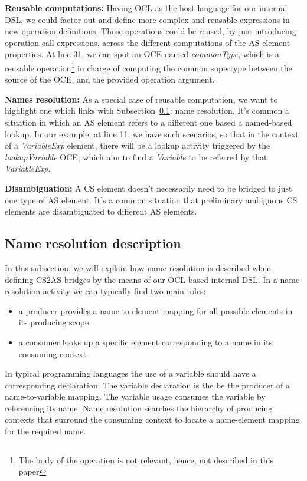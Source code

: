 \documentclass{llncs}
\begin{document}
\textbf{Reusable computations:} Having OCL as the  host language for our internal DSL, we could factor out and define more complex and reusable expressions in new operation definitions. Those operations could be reused, by just introducing operation call expressions, across the different computations of the AS element properties. At line 31, we can spot an OCE named \emph{commonType}, which is a reusable operation\footnote{The body of the operation is not relevant, hence, not described in this paper} in charge of computing the common supertype between the source of the OCE, and the provided operation argument.

\textbf{Names resolution:} As a special case of reusable computation, we want to highlight one which links with Subsection~\ref{subsec:nameReso}: name resolution. It's common a situation in which an AS element refers to a different one based a named-based lookup. In our example, at line 11, we have such scenarios, so that in the context of a \emph{VariableExp} element, there will be a lookup activity triggered by the \emph{lookupVariable} OCE, which aim to find a \emph{Variable} to be referred by that \emph{VariableExp}.

\textbf{Disambiguation:} A CS element doesn't necessarily need to be bridged to just one type of AS element. It's a common situation that preliminary ambiguous CS elements are disambiguated to different AS elements. %

\subsection{Name resolution description}
\label{subsec:nameReso}
In this subsection, we will explain how name resolution is described when defining CS2AS bridges by the means of our OCL-based internal DSL. In a name resolution activity we can typically find two main roles:
\begin{itemize}
\item a producer provides a name-to-element mapping for all possible elements in its producing scope. 
\item a consumer looks up a specific element corresponding to a name in its consuming context
\end{itemize}
In typical programming languages the use of a variable should have a corresponding declaration. The variable declaration is the be the producer of a name-to-variable mapping. The variable usage consumes the variable by referencing its name. Name resolution searches the hierarchy of producing contexts that surround the consuming context to locate a name-element mapping for the required name.
\end{document}
